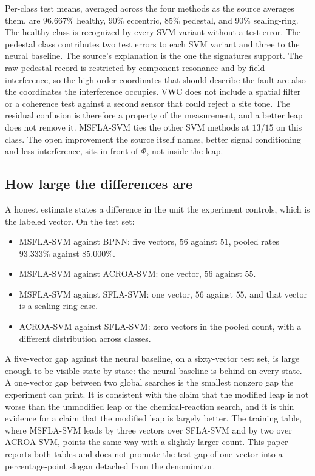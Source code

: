 Per-class test means, averaged across the four methods as the source averages them, are \(96.667\%\) healthy, \(90\%\) eccentric, \(85\%\) pedestal, and \(90\%\) sealing-ring.
The healthy class is recognized by every SVM variant without a test error.
The pedestal class contributes two test errors to each SVM variant and three to the neural baseline.
The source's explanation is the one the signatures support.
The raw pedestal record is restricted by component resonance and by field interference, so the high-order coordinates that should describe the fault are also the coordinates the interference occupies.
VWC does not include a spatial filter or a coherence test against a second sensor that could reject a site tone.
The residual confusion is therefore a property of the measurement, and a better leap does not remove it.
MSFLA-SVM ties the other SVM methods at \(13/15\) on this class.
The open improvement the source itself names, better signal conditioning and less interference, sits in front of \(\Phi\), not inside the leap.

\subsection{How large the differences are}

A honest estimate states a difference in the unit the experiment controls, which is the labeled vector.
On the test set:
\begin{itemize}
\item MSFLA-SVM against BPNN: five vectors, \(56\) against \(51\), pooled rates \(93.333\%\) against \(85.000\%\).
\item MSFLA-SVM against ACROA-SVM: one vector, \(56\) against \(55\).
\item MSFLA-SVM against SFLA-SVM: one vector, \(56\) against \(55\), and that vector is a sealing-ring case.
\item ACROA-SVM against SFLA-SVM: zero vectors in the pooled count, with a different distribution across classes.
\end{itemize}
A five-vector gap against the neural baseline, on a sixty-vector test set, is large enough to be visible state by state: the neural baseline is behind on every state.
A one-vector gap between two global searches is the smallest nonzero gap the experiment can print.
It is consistent with the claim that the modified leap is not worse than the unmodified leap or the chemical-reaction search, and it is thin evidence for a claim that the modified leap is largely better.
The training table, where MSFLA-SVM leads by three vectors over SFLA-SVM and by two over ACROA-SVM, points the same way with a slightly larger count.
This paper reports both tables and does not promote the test gap of one vector into a percentage-point slogan detached from the denominator.

